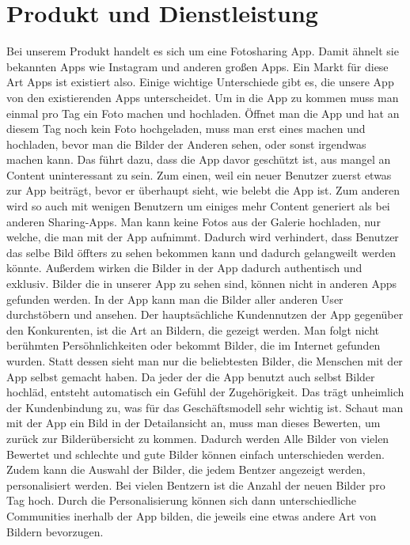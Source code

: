 \chapter{Produkt und Dienstleistung}

Bei unserem Produkt handelt es sich um eine Fotosharing App. Damit ähnelt sie bekannten Apps wie Instagram und anderen großen Apps. Ein Markt für diese Art Apps ist existiert also. Einige wichtige Unterschiede gibt es, die unsere App von den existierenden Apps unterscheidet.
Um in die App zu kommen muss man einmal pro Tag ein Foto machen und hochladen. Öffnet man die App und hat an diesem Tag noch kein Foto hochgeladen, muss man erst eines machen und hochladen, bevor man die Bilder der Anderen sehen, oder sonst irgendwas machen kann. Das führt dazu, dass die App davor geschützt ist, aus mangel an Content uninteressant zu sein. Zum einen, weil ein neuer Benutzer zuerst etwas zur App beiträgt, bevor er überhaupt sieht, wie belebt die App ist. Zum anderen wird so auch mit wenigen Benutzern um einiges mehr Content generiert als bei anderen Sharing-Apps.
Man kann keine Fotos aus der Galerie hochladen, nur welche, die man mit der App aufnimmt. Dadurch wird verhindert, dass Benutzer das selbe Bild öffters zu sehen bekommen kann und dadurch gelangweilt werden könnte. Außerdem wirken die Bilder in der App dadurch authentisch und exklusiv. Bilder die in unserer App zu sehen sind, können nicht in anderen Apps gefunden werden.
In der App kann man die Bilder aller anderen User durchstöbern und ansehen. Der hauptsächliche Kundennutzen der App gegenüber den Konkurenten, ist die Art an Bildern, die gezeigt werden. Man folgt nicht berühmten Persöhnlichkeiten oder bekommt Bilder, die im Internet gefunden wurden. Statt dessen sieht man nur die beliebtesten Bilder, die Menschen mit der App selbst gemacht haben. Da jeder der die App benutzt auch selbst Bilder hochläd, entsteht automatisch ein Gefühl der Zugehörigkeit. Das trägt unheimlich der Kundenbindung zu, was für das Geschäftsmodell sehr wichtig ist.
Schaut man mit der App ein Bild in der Detailansicht an, muss man dieses Bewerten, um zurück zur Bilderübersicht zu kommen. Dadurch werden Alle Bilder von vielen Bewertet und schlechte und gute Bilder können einfach unterschieden werden. Zudem kann die Auswahl der Bilder, die jedem Bentzer angezeigt werden, personalisiert werden. Bei vielen Bentzern ist die Anzahl der neuen Bilder pro Tag hoch. Durch die Personalisierung können sich dann unterschiedliche Communities inerhalb der App bilden, die jeweils eine etwas andere Art von Bildern bevorzugen.
